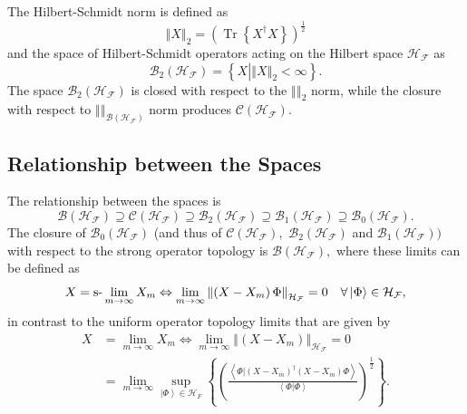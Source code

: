 \documentclass[aps,preprint,amsfonts,amssymb,showpacs,showkeys]{revtex4}%
\begin{document}
The Hilbert-Schmidt norm is defined as
\begin{equation}
\left\Vert X\right\Vert _{2}=\left(  \operatorname*{Tr}\left\{  X^{\dagger
}X\right\}  \right)  ^{\frac{1}{2}}%
\end{equation}
and the space of Hilbert-Schmidt operators acting on the Hilbert space
$\mathcal{H}_{\mathcal{F}}$ as
\begin{equation}
\mathcal{B}_{2}\left(  \mathcal{H}_{\mathcal{F}}\right)  =\left\{  X\left\vert
\left\Vert X\right\Vert _{2}<\infty\right.  \right\}  .
\end{equation}
The space $\mathcal{B}_{2}\left(  \mathcal{H}_{\mathcal{F}}\right)  $ is
closed with respect to the $\left\Vert {}\right\Vert _{2}$ norm, while the
closure with respect to $\left\Vert {}\right\Vert _{\mathcal{B}\left(
\mathcal{H}_{\mathcal{F}}\right)  }$ norm produces $\mathcal{C}\left(
\mathcal{H}_{\mathcal{F}}\right)  .$

\subsection{Relationship between the Spaces}

The relationship between the spaces is
\begin{equation}
\mathcal{B}\left(  \mathcal{H}_{\mathcal{F}}\right)  \supseteq\mathcal{C}%
\left(  \mathcal{H}_{\mathcal{F}}\right)  \supseteq\mathcal{B}_{2}\left(
\mathcal{H}_{\mathcal{F}}\right)  \supseteq\mathcal{B}_{1}\left(
\mathcal{H}_{\mathcal{F}}\right)  \supseteq\mathcal{B}_{0}\left(
\mathcal{H}_{\mathcal{F}}\right)  .
\end{equation}
The closure of $\mathcal{B}_{0}\left(  \mathcal{H}_{\mathcal{F}}\right)  $
(and thus of $\mathcal{C}\left(  \mathcal{H}_{\mathcal{F}}\right)  ,$
$\mathcal{B}_{2}\left(  \mathcal{H}_{\mathcal{F}}\right)  $ and $\mathcal{B}%
_{1}\left(  \mathcal{H}_{\mathcal{F}}\right)  )$ with respect to the strong
operator topology is $\mathcal{B}\left(  \mathcal{H}_{\mathcal{F}}\right)  ,$
where these limits can be defined as
\begin{equation}
X=\text{\textrm{s-}}\lim_{m\rightarrow\infty}X_{m}\Leftrightarrow
\lim_{m\rightarrow\infty}\left\Vert \left(  X-X_{m}\right)  \Phi\right\Vert
_{\mathcal{H}_{\mathcal{F}}}=0\quad\forall\left\vert \Phi\right\rangle
\in\mathcal{H}_{\mathcal{F}},
\end{equation}
in contrast to the uniform operator topology limits that are given by%
\begin{align}
X  &  =\lim_{m\rightarrow\infty}X_{m}\Leftrightarrow\lim_{m\rightarrow\infty
}\left\Vert \left(  X-X_{m}\right)  \right\Vert _{\mathcal{H}_{\mathcal{F}}%
}=0\nonumber\\
&  =\lim_{m\rightarrow\infty}\sup_{\left\vert \Phi\right\rangle \in
\mathcal{H}_{F}}\left\{  \left(  \frac{\left\langle \left.  \Phi\right\vert
\left(  X-X_{m}\right)  ^{\dagger}\left(  X-X_{m}\right)  \Phi\right\rangle
}{\left\langle \left.  \Phi\right\vert \Phi\right\rangle }\right)  ^{\frac
{1}{2}}\right\}  .
\end{align}
\end{document}
